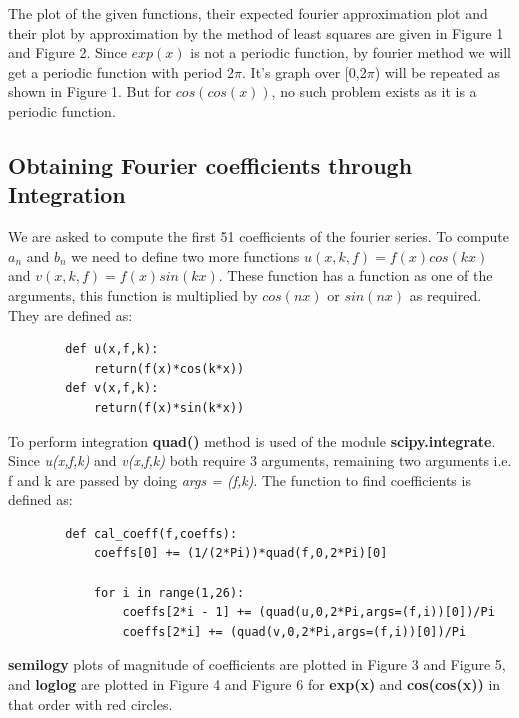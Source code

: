 \documentclass[11pt, a4paper]{article}
\begin{document}
    The plot of the given functions, their expected fourier approximation plot and their plot by approximation by the method of least squares are given in Figure 1 and Figure 2. Since $exp(x)$ is not a periodic function, by fourier method we will get a periodic function with period 2$\pi$. It's graph over [0,2$\pi$) will be repeated as shown in Figure 1. But for $cos(cos(x))$, no such problem exists as it is a periodic function.
    \subsection{Obtaining Fourier coefficients through Integration}
    We are asked to compute the first 51 coefficients of the fourier series.
    To compute $a_n$ and $b_n$ we need to define two more functions $u(x,k,f) = f(x)cos(kx)$ and $v(x,k,f) = f(x)sin(kx)$. These function has a function as one of the arguments, this function is multiplied by $cos(nx)$ or $sin(nx)$ as required. They are defined as:
    \begin{verbatim}
        def u(x,f,k):
            return(f(x)*cos(k*x))
        def v(x,f,k):
            return(f(x)*sin(k*x))
    \end{verbatim}
    To perform integration \textbf{quad()} method is used of the module \textbf{scipy.integrate}. Since \textit{u(x,f,k)} and \textit{v(x,f,k)} both require 3 arguments, remaining two arguments i.e. f and k are passed by doing \textit{args = (f,k)}. The function to find coefficients is defined as:
    \begin{verbatim}
        def cal_coeff(f,coeffs):
            coeffs[0] += (1/(2*Pi))*quad(f,0,2*Pi)[0]
    
            for i in range(1,26):
                coeffs[2*i - 1] += (quad(u,0,2*Pi,args=(f,i))[0])/Pi
                coeffs[2*i] += (quad(v,0,2*Pi,args=(f,i))[0])/Pi
    \end{verbatim}
    \textbf{semilogy} plots of magnitude of coefficients are plotted in Figure 3 and Figure 5, and \textbf{loglog} are plotted in Figure 4 and Figure 6 for \textbf{exp(x)} and \textbf{cos(cos(x))} in that order with red circles.
\end{document}
